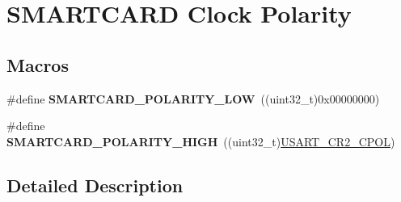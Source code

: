 \hypertarget{group___s_m_a_r_t_c_a_r_d___clock___polarity}{}\section{S\+M\+A\+R\+T\+C\+A\+RD Clock Polarity}
\label{group___s_m_a_r_t_c_a_r_d___clock___polarity}
\subsection*{Macros}
\begin{DoxyCompactItemize}
\item 
\#define {\bfseries S\+M\+A\+R\+T\+C\+A\+R\+D\+\_\+\+P\+O\+L\+A\+R\+I\+T\+Y\+\_\+\+L\+OW}~((uint32\+\_\+t)0x00000000)\hypertarget{group___s_m_a_r_t_c_a_r_d___clock___polarity_ga07e246426d125fbc19f8e363f09b21e5}{}\label{group___s_m_a_r_t_c_a_r_d___clock___polarity_ga07e246426d125fbc19f8e363f09b21e5}

\item 
\#define {\bfseries S\+M\+A\+R\+T\+C\+A\+R\+D\+\_\+\+P\+O\+L\+A\+R\+I\+T\+Y\+\_\+\+H\+I\+GH}~((uint32\+\_\+t)\hyperlink{group___peripheral___registers___bits___definition_gafbb4336ac93d94d4e78f9fb7b3a0dc68}{U\+S\+A\+R\+T\+\_\+\+C\+R2\+\_\+\+C\+P\+OL})\hypertarget{group___s_m_a_r_t_c_a_r_d___clock___polarity_ga69e81ca7759a40f9e13c4051fe44a95f}{}\label{group___s_m_a_r_t_c_a_r_d___clock___polarity_ga69e81ca7759a40f9e13c4051fe44a95f}

\end{DoxyCompactItemize}


\subsection{Detailed Description}
